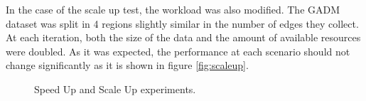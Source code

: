 In the case of the scale up test, the workload was also modified.  The GADM dataset was split in 4 regions slightly similar in the number of edges they collect.  At each iteration, both the size of the data and the amount of available resources were doubled. As it was expected, the performance at each scenario should not change significantly as it is shown in figure \ref{fig:scaleup}.

\begin{figure}[!ht]
    \centering
    \hfill
    \caption{Speed Up and Scale Up experiments.} \label{fig:speed_scale} 
\end{figure}
